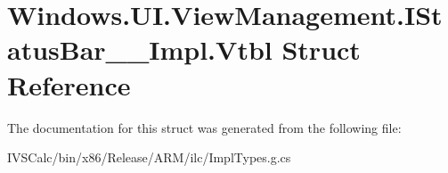 \hypertarget{struct_windows_1_1_u_i_1_1_view_management_1_1_i_status_bar_____impl_1_1_vtbl}{}\section{Windows.\+U\+I.\+View\+Management.\+I\+Status\+Bar\+\_\+\+\_\+\+Impl.\+Vtbl Struct Reference}
\label{struct_windows_1_1_u_i_1_1_view_management_1_1_i_status_bar_____impl_1_1_vtbl}


The documentation for this struct was generated from the following file\+:\begin{DoxyCompactItemize}
\item 
I\+V\+S\+Calc/bin/x86/\+Release/\+A\+R\+M/ilc/Impl\+Types.\+g.\+cs\end{DoxyCompactItemize}
